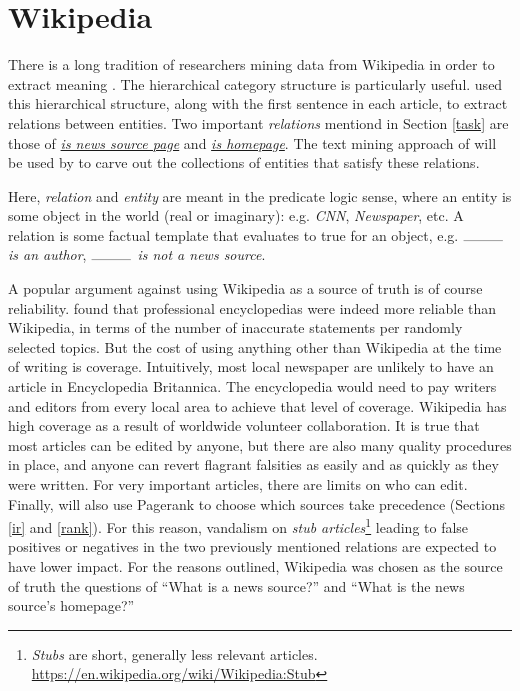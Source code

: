\clearpage
\section{Wikipedia}

There is a long tradition of researchers mining data from Wikipedia in order to
extract meaning \cite{nguyen2007, nakayama2007, lehmann2015}.  The
hierarchical category structure is particularly useful.
 used this hierarchical structure, along with the
first sentence in each article, to extract relations between entities.
Two important {\it relations} mentiond in Section \ref{task} are those
of \underline{{\it is news source page}} and \underline{{\it is homepage}}.  The text
mining approach of  will be used by \nr{} to carve out
the collections of entities that satisfy these relations.

Here, {\it relation} and {\it entity} are meant in the predicate
logic sense, where an entity is some object in the world
(real or imaginary): e.g. {\it CNN}, {\it Newspaper}, etc.  A relation is
some factual template that evaluates to true for an object, e.g.
{\it $\rule{1cm}{0.09mm}$ is an author},
{\it $\rule{1cm}{0.09mm}$ is not a news source}.

A popular argument against using Wikipedia as a source of truth
is of course reliability.  found that professional
encyclopedias were indeed more reliable than Wikipedia, in terms
of the number of inaccurate statements per randomly selected topics.  But
the cost of using anything other than Wikipedia at the time of writing
is coverage.  Intuitively, most local newspaper are unlikely to have
an article in Encyclopedia Britannica. The encyclopedia would
need to pay writers and editors from every local area to achieve
that level of coverage.  Wikipedia has high coverage as a result
of worldwide volunteer collaboration.  It is true that most articles
can be edited by anyone, but there are also many quality procedures
in place, and anyone can revert flagrant falsities as easily and as
quickly as they were written.  For very important articles, there
are limits on who can edit.  Finally, \nr{} will also use Pagerank
to choose which sources take precedence (Sections \ref{ir} and \ref{rank}).
For this reason, vandalism on {\it stub articles}\footnote{
{\it Stubs} are short, generally less relevant articles.
\url{https://en.wikipedia.org/wiki/Wikipedia:Stub}
}
leading to false positives or negatives in the two previously mentioned
relations are expected to have lower impact.  For the reasons
outlined, Wikipedia was chosen as the source of truth the questions of
``What is a news source?'' and ``What is the news source's homepage?''